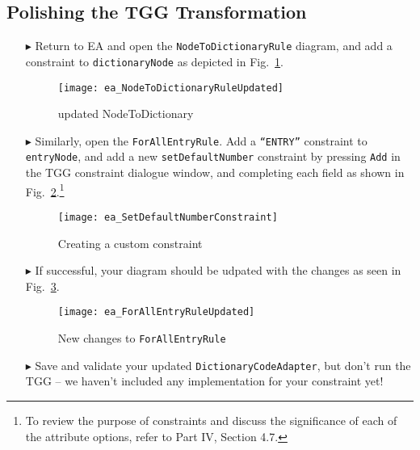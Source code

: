 \newpage
\hypertarget{m2tvis}{}
\subsection{Polishing the TGG Transformation}
\visHeader

\begin{itemize}

\item[$\blacktriangleright$] Return to EA and open the \texttt{NodeToDictionaryRule} diagram, and add a constraint to \texttt{dictionaryNode} as depicted in
Fig.~\ref{ea:NodeToDictionaryRuleUpdated}.

\vspace{0.5cm}

\begin{figure}[htp]
 \hspace{-1.5cm}
  \texttt{[image: ea\_NodeToDictionaryRuleUpdated]}
  \caption{updated NodeToDictionary}
  \label{ea:NodeToDictionaryRuleUpdated}
\end{figure}

\item[$\blacktriangleright$] Similarly, open the \texttt{ForAllEntryRule}. Add a \texttt{``ENTRY''} constraint to \texttt{entryNode}, and add a new
\texttt{setDefaultNumber} constraint by pressing \texttt{Add} in the TGG constraint dialogue window, and completing each field as shown in
Fig.~\ref{ea:setDefaultConstraintDialogue}.\footnote{ To review the purpose of constraints and discuss the significance of each of the attribute options, refer
to Part IV, Section 4.7.}

\vspace{0.5cm}

\begin{figure}[htp]
\begin{center}
  \texttt{[image: ea\_SetDefaultNumberConstraint]}
  \caption{Creating a custom constraint}
  \label{ea:setDefaultConstraintDialogue}
\end{center}
\end{figure}

\newpage

\item[$\blacktriangleright$] If successful, your diagram should be udpated with the changes as seen in Fig.~\ref{ea:ForAllEntryRuleUpdated}.

\vspace{0.5cm}

\begin{figure}[htp]
 \hspace{-2cm}
  \texttt{[image: ea\_ForAllEntryRuleUpdated]}
  \caption{New changes to \texttt{ForAllEntryRule}}
  \label{ea:ForAllEntryRuleUpdated}
\end{figure}

\vspace{0.5cm}

\item[$\blacktriangleright$] Save and validate your updated \texttt{DictionaryCodeAdapter}, but don't run the TGG -- we haven't included any
implementation for your constraint yet!


\end{itemize}
